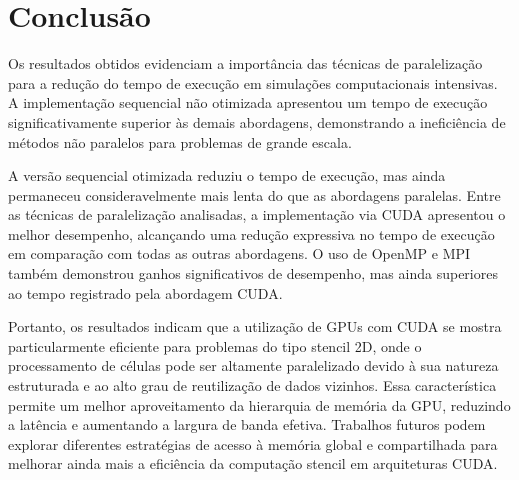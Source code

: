 \section{Conclusão}

Os resultados obtidos evidenciam a importância das técnicas de paralelização para a redução do tempo de execução em simulações computacionais intensivas. A implementação sequencial não otimizada apresentou um tempo de execução significativamente superior às demais abordagens, demonstrando a ineficiência de métodos não paralelos para problemas de grande escala.

A versão sequencial otimizada reduziu o tempo de execução, mas ainda permaneceu consideravelmente mais lenta do que as abordagens paralelas. Entre as técnicas de paralelização analisadas, a implementação via CUDA apresentou o melhor desempenho, alcançando uma redução expressiva no tempo de execução em comparação com todas as outras abordagens. O uso de OpenMP e MPI também demonstrou ganhos significativos de desempenho, mas ainda superiores ao tempo registrado pela abordagem CUDA.

Portanto, os resultados indicam que a utilização de GPUs com CUDA se mostra particularmente eficiente para problemas do tipo stencil 2D, onde o processamento de células pode ser altamente paralelizado devido à sua natureza estruturada e ao alto grau de reutilização de dados vizinhos. Essa característica permite um melhor aproveitamento da hierarquia de memória da GPU, reduzindo a latência e aumentando a largura de banda efetiva. Trabalhos futuros podem explorar diferentes estratégias de acesso à memória global e compartilhada para melhorar ainda mais a eficiência da computação stencil em arquiteturas CUDA.
